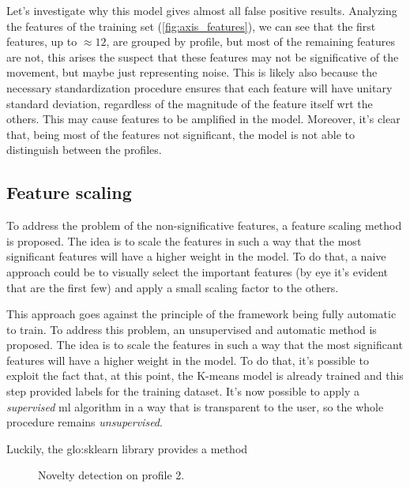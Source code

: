 Let's investigate why this model gives almost all false positive results. Analyzing the features of the training set (\autoref{fig:axis_features}), we can see that the first features, up to $\approx 12$, are grouped by profile, but most of the remaining features are not, this arises the suspect that these features may not be significative of the movement, but maybe just representing noise. This is likely also because the necessary standardization procedure ensures that each feature will have unitary standard deviation, regardless of the magnitude of the feature itself \gls{wrt} the others. This may cause  features to be amplified in the model. Moreover, it's clear that, being most of the features not significant, the model is not able to distinguish between the profiles.

\subsection{Feature scaling}
To address the problem of the non-significative features, a feature scaling method is proposed. The idea is to scale the features in such a way that the most significant features will have a higher weight in the model. To do that, a naive approach could be to visually select the important features (by eye it's evident that are the first few) and apply a small scaling factor to the others. 

This approach goes against the principle of the framework being fully automatic to train. To address this problem, an unsupervised and automatic method is proposed. The idea is to scale the features in such a way that the most significant features will have a higher weight in the model. To do that, it's possible to exploit the fact that, at this point, the K-means model is already trained and this step provided labels for the training dataset. It's now possible to apply a \emph{supervised} \gls{ml} algorithm in a way that is transparent to the user, so the whole procedure remains \emph{unsupervised}.

Luckily, the \gls{glo:sklearn} library provides a method \todo


\begin{figure}
    \centering
    \caption{Novelty detection on profile 2.}
    \label{fig:axis_testing}
\end{figure}